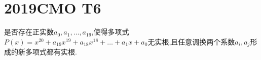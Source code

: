 \documentclass[]{article}
\title{}
\author{}
\date{}
\begin{document}
\maketitle
\section{2019CMO T6}{
是否存在正实数$a_0,a_1,…,a_{19}$,使得多项式$P(x)=x^{20}+a_{19}x^{19}+a_{18}x^{18}+…+a_1x+a_0$无实根,且任意调换两个系数$a_i,a_j$形成的新多项式都有实根.
}
\end{document}
